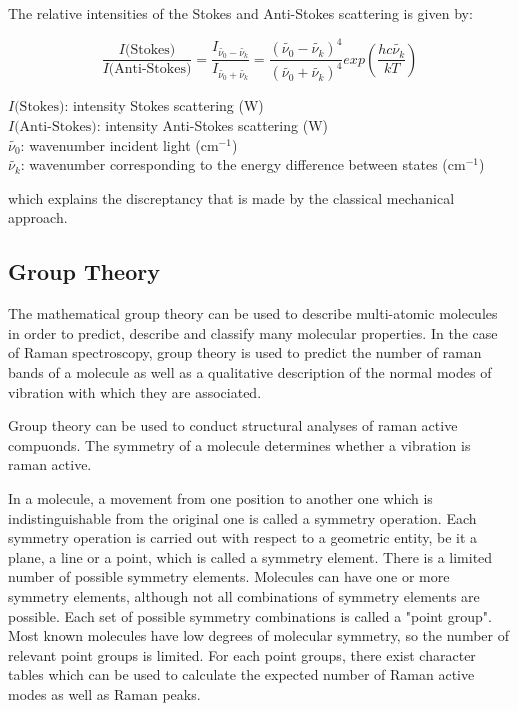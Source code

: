 \bigskip

The relative intensities of the Stokes and Anti-Stokes scattering is given by:

\begin{equation}
    \frac{I \text{(Stokes)}}{I \text{(Anti-Stokes)}} = \frac{I_{\widetilde{\nu_0} - \widetilde{\nu_k}}}{I_{\widetilde{\nu_0} + \widetilde{\nu_k}}} = \frac{(\widetilde{\nu_0} - \widetilde{\nu_k})^4}{(\widetilde{\nu_0} + \widetilde{\nu_k})^4}exp \left( \frac{hc\widetilde{\nu_k}}{kT}\right)
 \end{equation}

 \(I \text{(Stokes)}\): intensity Stokes scattering (\unit{\watt})\\
 \(I \text{(Anti-Stokes)}\): intensity Anti-Stokes scattering (\unit{\watt})\\
\(\widetilde{\nu_0}\): wavenumber incident light (cm\(^{-1}\))\\
\(\widetilde{\nu_k}\): wavenumber corresponding to the energy difference between states (cm\(^{-1}\))

\bigskip


which explains the discreptancy that is made by the classical mechanical approach. \cite{theory1} \cite{presentation}

\newpage

\subsection{Group Theory}
The mathematical group theory can be used to describe multi-atomic molecules in order to predict, describe and classify many molecular properties. In the case of Raman spectroscopy, group theory is used to predict the number of raman bands of a molecule as well as a qualitative description of the normal modes of vibration with which they are associated.

\bigskip

Group theory can be used to conduct structural analyses of raman active compuonds. The symmetry of a molecule determines whether a vibration is raman active. 

\bigskip

In a molecule, a movement from one position to another one which is indistinguishable from the original one is called a symmetry operation. Each symmetry operation is carried out with respect to a geometric entity, be it a plane, a line or a point, which is called a symmetry element. There is a limited number of possible symmetry elements. Molecules can have one or more symmetry elements, although not all combinations of symmetry elements are possible. Each set of possible symmetry combinations is called a "point group". Most known molecules have low degrees of molecular symmetry, so the number of relevant point groups is limited. For each point groups, there exist character tables which can be used to calculate the expected number of Raman active modes as well as Raman peaks. \cite{gt}